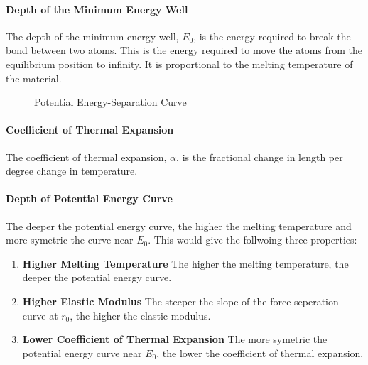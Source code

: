 \documentclass[11pt]{article}
\begin{document}
\paragraph{Depth of the Minimum Energy Well} The depth of the minimum energy well, $E_0$, is the energy required to break the bond between two atoms. This is the energy required to move the atoms from the equilibrium position to infinity. It is proportional to the melting temperature of the material.
\begin{figure}[h]
    \centering
    \caption{Potential Energy-Separation Curve}
    \label{fig:potential-energy}
\end{figure}
\paragraph{Coefficient of Thermal Expansion} The coefficient of thermal expansion, $\alpha$, is the fractional change in length per degree change in temperature. 
\paragraph{Depth of Potential Energy Curve} The deeper the potential energy curve, the higher the melting temperature and more symetric the curve near $E_0$. This would give the follwoing three properties:
\begin{enumerate}
    \item \textbf{Higher Melting Temperature} The higher the melting temperature, the deeper the potential energy curve.
    \item \textbf{Higher Elastic Modulus} The steeper the slope of the force-seperation curve at $r_0$, the higher the elastic modulus.
    \item \textbf{Lower Coefficient of Thermal Expansion} The more symetric the potential energy curve near $E_0$, the lower the coefficient of thermal expansion.
\end{enumerate}
\end{document}
